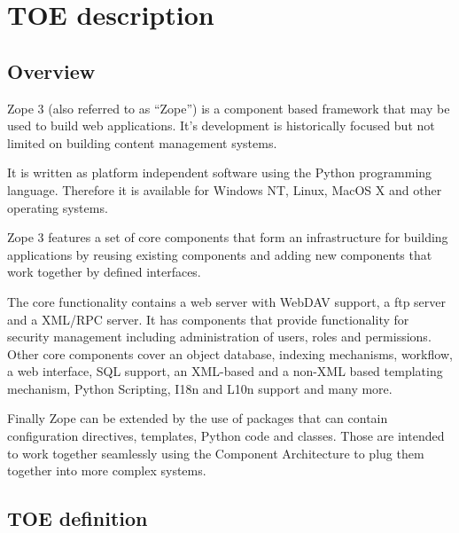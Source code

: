\documentclass[12pt,english]{scrbook}
\begin{document}



\chapter{TOE description}





\section{Overview}

Zope 3 (also referred to as ``Zope'') is a component based framework that may be
used to build web applications. It's development is historically focused but
not limited on building content management systems.

It is written as platform independent software using the Python programming
language. Therefore it is available for Windows NT, Linux, MacOS X and other
operating systems.

Zope 3 features a set of core components that form an infrastructure for 
building applications by reusing existing components and adding new components
that work together by defined interfaces.

The core functionality contains a web server with WebDAV support, a ftp server
and a XML/RPC server.  It has components that provide functionality for
security management including administration of users, roles and permissions.
Other core components cover an object database, indexing mechanisms,
workflow, a web interface, SQL support, an XML-based and a non-XML based templating
mechanism, Python Scripting, I18n and L10n support and many more.

Finally Zope can be extended by the use of packages that can contain
configuration directives, templates, Python code and classes. Those are
intended to work together seamlessly using the Component Architecture to plug
them together into more complex systems.





\section{TOE definition}
\end{document}
